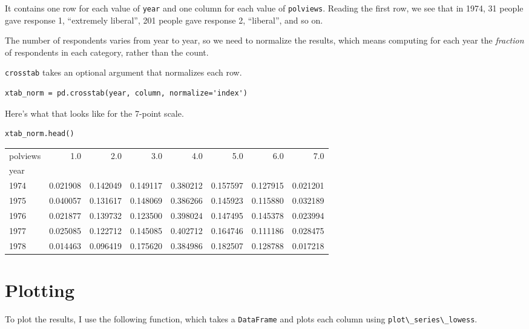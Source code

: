 It contains one row for each value of \passthrough{\lstinline!year!} and
one column for each value of \passthrough{\lstinline!polviews!}. Reading
the first row, we see that in 1974, 31 people gave response 1,
``extremely liberal'', 201 people gave response 2, ``liberal'', and so
on.

The number of respondents varies from year to year, so we need to
normalize the results, which means computing for each year the
\emph{fraction} of respondents in each category, rather than the count.

\passthrough{\lstinline!crosstab!} takes an optional argument that
normalizes each row.

\begin{lstlisting}[]
xtab_norm = pd.crosstab(year, column, normalize='index')
\end{lstlisting}

Here's what that looks like for the 7-point scale.

\begin{lstlisting}[]
xtab_norm.head()
\end{lstlisting}

\begin{tabular}{lrrrrrrr}
\midrule
polviews &       1.0 &       2.0 &       3.0 &       4.0 &       5.0 &       6.0 &       7.0 \\
year &           &           &           &           &           &           &           \\
\midrule
1974 &  0.021908 &  0.142049 &  0.149117 &  0.380212 &  0.157597 &  0.127915 &  0.021201 \\
1975 &  0.040057 &  0.131617 &  0.148069 &  0.386266 &  0.145923 &  0.115880 &  0.032189 \\
1976 &  0.021877 &  0.139732 &  0.123500 &  0.398024 &  0.147495 &  0.145378 &  0.023994 \\
1977 &  0.025085 &  0.122712 &  0.145085 &  0.402712 &  0.164746 &  0.111186 &  0.028475 \\
1978 &  0.014463 &  0.096419 &  0.175620 &  0.384986 &  0.182507 &  0.128788 &  0.017218 \\
\midrule
\end{tabular}

\hypertarget{plotting}{%
\section{Plotting}\label{plotting}}

To plot the results, I use the following function, which takes a
\passthrough{\lstinline!DataFrame!} and plots each column using
\passthrough{\lstinline!plot\_series\_lowess!}.


